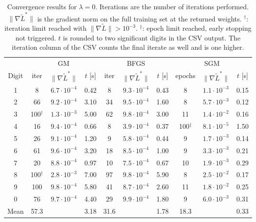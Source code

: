\documentclass{article}
\begin{document}
\begin{table}[h]
\centering
\small
\setlength{\tabcolsep}{3pt}
\begin{tabular}{c ccc ccc ccc}
\toprule
 & \multicolumn{3}{c}{GM} & \multicolumn{3}{c}{BFGS} & \multicolumn{3}{c}{SGM} \\
\cmidrule(lr){2-4}\cmidrule(lr){5-7}\cmidrule(lr){8-10}
Digit & iter & $\|\nabla\tilde L^*\|$ & $t$ [s] & iter & $\|\nabla\tilde L^*\|$ & $t$ [s] & epochs & $\|\nabla\tilde L^*\|$ & $t$ [s] \\
\midrule
1 & 8 & $6.7\!\cdot\!10^{-4}$ & 0.42 & 8 & $9.3\!\cdot\!10^{-4}$ & 0.43 & 8 & $1.1\!\cdot\!10^{-3}$ & 0.15 \\
2 & 66 & $9.2\!\cdot\!10^{-4}$ & 3.10 & 34 & $9.5\!\cdot\!10^{-4}$ & 1.60 & 8 & $5.7\!\cdot\!10^{-3}$ & 0.12 \\
3 & 100$^\dagger$ & $1.3\!\cdot\!10^{-3}$ & 5.00 & 62 & $9.8\!\cdot\!10^{-4}$ & 3.00 & 11 & $1.4\!\cdot\!10^{-2}$ & 0.16 \\
4 & 16 & $9.4\!\cdot\!10^{-4}$ & 0.66 & 8 & $3.9\!\cdot\!10^{-4}$ & 0.37 & 100$^\ddagger$ & $8.1\!\cdot\!10^{-5}$ & 1.50 \\
5 & 26 & $9.1\!\cdot\!10^{-4}$ & 1.20 & 9 & $5.8\!\cdot\!10^{-4}$ & 0.44 & 9 & $1.7\!\cdot\!10^{-3}$ & 0.14 \\
6 & 61 & $9.6\!\cdot\!10^{-4}$ & 3.20 & 18 & $8.5\!\cdot\!10^{-4}$ & 1.00 & 9 & $3.3\!\cdot\!10^{-3}$ & 0.21 \\
7 & 20 & $8.8\!\cdot\!10^{-4}$ & 0.97 & 10 & $7.5\!\cdot\!10^{-4}$ & 0.67 & 10 & $1.9\!\cdot\!10^{-3}$ & 0.29 \\
8 & 100$^\dagger$ & $2.8\!\cdot\!10^{-3}$ & 7.00 & 97 & $9.8\!\cdot\!10^{-4}$ & 5.90 & 8 & $2.5\!\cdot\!10^{-2}$ & 0.17 \\
9 & 100 & $9.8\!\cdot\!10^{-4}$ & 5.80 & 41 & $8.7\!\cdot\!10^{-4}$ & 2.60 & 11 & $1.8\!\cdot\!10^{-2}$ & 0.25 \\
0 & 76 & $9.7\!\cdot\!10^{-4}$ & 4.40 & 29 & $9.9\!\cdot\!10^{-4}$ & 1.80 & 9 & $6.0\!\cdot\!10^{-3}$ & 0.31 \\
\midrule
Mean & 57.3 &  & 3.18 & 31.6 &  & 1.78 & 18.3 &  & 0.33 \\
\bottomrule
\end{tabular}
\caption{Convergence results for $\lambda=0$. Iterations are the number of iterations performed. $\|\nabla\tilde L^*\|$ is the gradient norm on the full training set at the returned weights. $^\dagger$: iteration limit reached with $\|\nabla\tilde L\|>10^{-3}$. $^\ddagger$: epoch limit reached, early stopping not triggered. $t$ is rounded to two significant digits in the CSV output. The iteration column of the CSV counts the final iterate as well and is one higher.}
\label{tab:conv}
\end{table}
\end{document}
